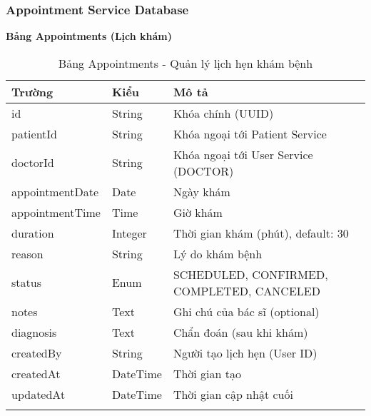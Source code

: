 \documentclass[12pt,a4paper]{report}
\begin{document}
    \subsubsection{Appointment Service Database}
    \textbf{Bảng Appointments (Lịch khám)}
    \begin{longtable}{|p{3cm}|p{2cm}|p{8cm}|}
    \hline
    \textbf{Trường} & \textbf{Kiểu} & \textbf{Mô tả} \\
    \hline
    id & String & Khóa chính (UUID) \\
    \hline
    patientId & String & Khóa ngoại tới Patient Service \\
    \hline
    doctorId & String & Khóa ngoại tới User Service (DOCTOR) \\
    \hline
    appointmentDate & Date & Ngày khám \\
    \hline
    appointmentTime & Time & Giờ khám \\
    \hline
    duration & Integer & Thời gian khám (phút), default: 30 \\
    \hline
    reason & String & Lý do khám bệnh \\
    \hline
    status & Enum & SCHEDULED, CONFIRMED, COMPLETED, CANCELED \\
    \hline
    notes & Text & Ghi chú của bác sĩ (optional) \\
    \hline
    diagnosis & Text & Chẩn đoán (sau khi khám) \\
    \hline
    createdBy & String & Người tạo lịch hẹn (User ID) \\
    \hline
    createdAt & DateTime & Thời gian tạo \\
    \hline
    updatedAt & DateTime & Thời gian cập nhật cuối \\
    \hline
    \caption{Bảng Appointments - Quản lý lịch hẹn khám bệnh}
    \end{longtable}
\end{document}
